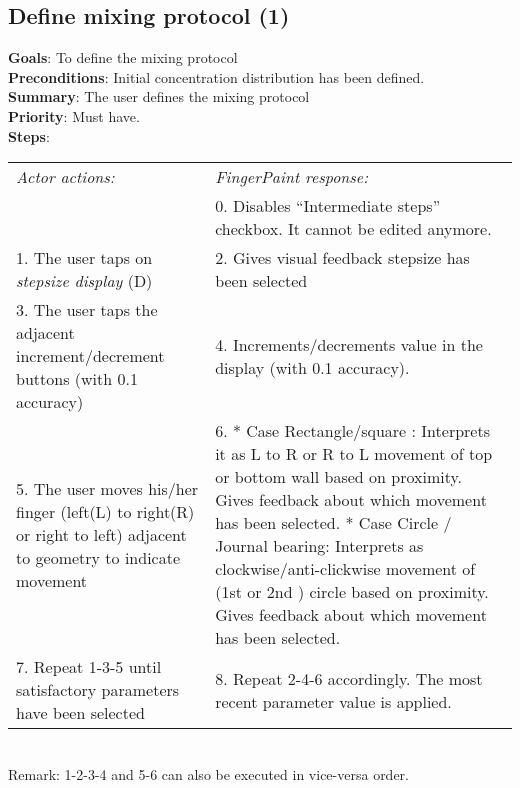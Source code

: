 \begin{appendices}
  \section{Define mixing protocol (1)}
  \textbf{Goals}: To define the mixing protocol\\
  \textbf{Preconditions}: Initial concentration distribution has been defined.\\
  \textbf{Summary}: The user defines the mixing protocol\\
  \textbf{Priority}: Must have.\\
  \textbf{Steps}: \\
  \begin{tabular}{ p{} p{} }
  	\emph{Actor actions:} & \emph{FingerPaint response:} \\
    & 0.     Disables “Intermediate steps” checkbox. It cannot be edited anymore.\\
    1. The user taps on \emph{stepsize display} (D) & 2.	Gives visual feedback stepsize has been selected\\
    3. The user taps the adjacent increment/decrement buttons (with 0.1 accuracy) & 4.	Increments/decrements value in the display (with 0.1 accuracy). \\
    5. The user moves his/her finger (left(L) to right(R) or right to left) adjacent to geometry to indicate movement & 6.	* Case Rectangle/square : Interprets it as L to R or R to L movement of top or bottom wall based on proximity. Gives feedback about which movement has been selected. * Case Circle / Journal bearing: Interprets as clockwise/anti-clickwise movement of (1st or 2nd ) circle based on proximity. Gives feedback about which movement has been selected.\\
    7.	Repeat 1-3-5 until satisfactory parameters have been selected & 8.	Repeat 2-4-6 accordingly. The most recent parameter value is applied.\\
  \end{tabular}
\\Remark: 1-2-3-4 and 5-6 can also be executed in vice-versa order.


\end{appendices}
